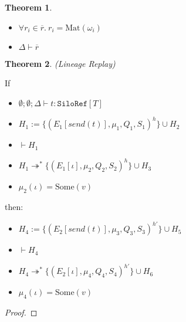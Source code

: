 \documentclass{article}
\theoremstyle{definition}
\newtheorem{thm}{Theorem}[section]
\newcommand{\seq}[1]{\overline{#1}}
\begin{document}
\begin{thm}
\begin{itemize}
\item $\forall r_i \in \seq{r}.~r_i = \text{Mat}(\omega_i)$
\item $\Delta \vdash \seq{r}$
\end{itemize}


\end{thm}

\begin{thm}
\emph{(Lineage Replay)}\label{thm:replay}

If
\begin{itemize}
\item $\emptyset ; \emptyset ; \Delta \vdash t : \texttt{SiloRef}[T]$
\item $H_1 := \{ (E_1[send(t)], \mu_1, Q_1, S_1)^h \} \cup H_2$
\item $\vdash H_1$
\item $H_1 \twoheadrightarrow^* \{ (E_1[\iota], \mu_2, Q_2, S_2)^h \} \cup H_3$
\item $\mu_2(\iota) = \text{Some}(v)$
\end{itemize}
then:
\begin{itemize}
\item $H_4 := \{ (E_2[send(t)], \mu_3, Q_3, S_3)^{h'} \} \cup H_5$
\item $\vdash H_4$
\item $H_4 \twoheadrightarrow^* \{ (E_2[\iota], \mu_4, Q_4, S_4)^{h'} \} \cup H_6$
\item $\mu_4(\iota) = \text{Some}(v)$
\end{itemize}

\end{thm}
\begin{proof}
\end{proof}

\newpage

%
%

\end{document}

